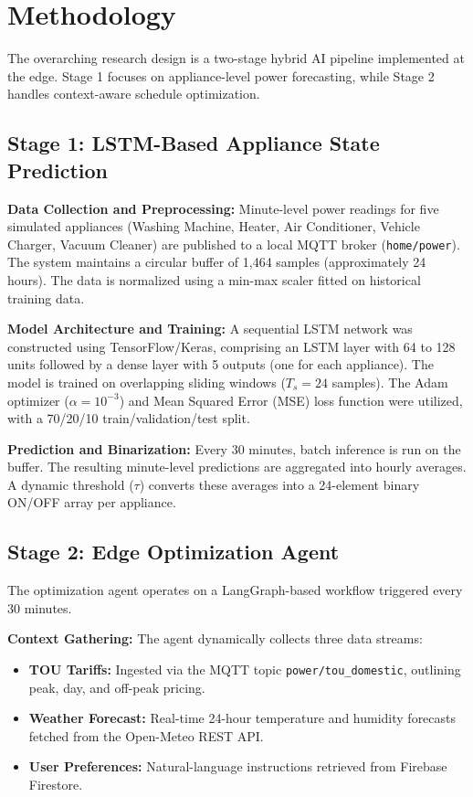 \documentclass[12pt, a4paper]{article}
\begin{document}
\section{Methodology}

The overarching research design is a two-stage hybrid AI pipeline implemented at the edge. Stage 1 focuses on appliance-level power forecasting, while Stage 2 handles context-aware schedule optimization.

\subsection{Stage 1: LSTM-Based Appliance State Prediction}
\textbf{Data Collection and Preprocessing:} Minute-level power readings for five simulated appliances (Washing Machine, Heater, Air Conditioner, Vehicle Charger, Vacuum Cleaner) are published to a local MQTT broker (\texttt{home/power}). The system maintains a circular buffer of 1,464 samples (approximately 24 hours). The data is normalized using a min-max scaler fitted on historical training data. 

\textbf{Model Architecture and Training:} A sequential LSTM network was constructed using TensorFlow/Keras, comprising an LSTM layer with 64 to 128 units followed by a dense layer with 5 outputs (one for each appliance). The model is trained on overlapping sliding windows ($T_s = 24$ samples). The Adam optimizer ($\alpha = 10^{-3}$) and Mean Squared Error (MSE) loss function were utilized, with a 70/20/10 train/validation/test split.

\textbf{Prediction and Binarization:} Every 30 minutes, batch inference is run on the buffer. The resulting minute-level predictions are aggregated into hourly averages. A dynamic threshold ($\tau$) converts these averages into a 24-element binary ON/OFF array per appliance. 

\subsection{Stage 2: Edge Optimization Agent}
The optimization agent operates on a LangGraph-based workflow triggered every 30 minutes.

\textbf{Context Gathering:} The agent dynamically collects three data streams:
\begin{itemize}
    \item \textbf{TOU Tariffs:} Ingested via the MQTT topic \texttt{power/tou\_domestic}, outlining peak, day, and off-peak pricing.
    \item \textbf{Weather Forecast:} Real-time 24-hour temperature and humidity forecasts fetched from the Open-Meteo REST API.
    \item \textbf{User Preferences:} Natural-language instructions retrieved from Firebase Firestore.
\end{itemize}
\end{document}
